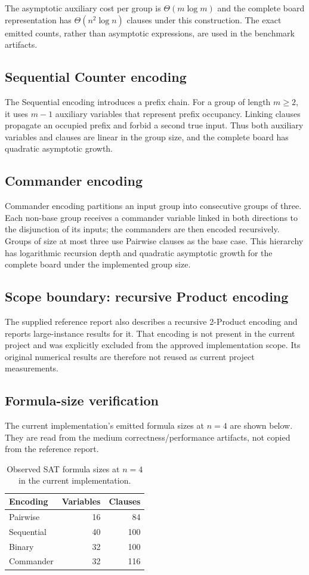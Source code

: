 \documentclass[a4paper,fleqn]{cas-sc}
\begin{document}
The asymptotic auxiliary cost per group is $\Theta(m\log m)$ and the complete
board representation has $\Theta(n^2\log n)$ clauses under this construction.
The exact emitted counts, rather than asymptotic expressions, are used in the
benchmark artifacts.

\subsection{Sequential Counter encoding}
The Sequential encoding introduces a prefix chain. For a group of length
$m\ge2$, it uses $m-1$ auxiliary variables that represent prefix occupancy.
Linking clauses propagate an occupied prefix and forbid a second true input.
Thus both auxiliary variables and clauses are linear in the group size, and
the complete board has quadratic asymptotic growth.

\subsection{Commander encoding}
Commander encoding partitions an input group into consecutive groups of three.
Each non-base group receives a commander variable linked in both directions to
the disjunction of its inputs; the commanders are then encoded recursively.
Groups of size at most three use Pairwise clauses as the base case. This
hierarchy has logarithmic recursion depth and quadratic asymptotic growth for
the complete board under the implemented group size.

\subsection{Scope boundary: recursive Product encoding}
The supplied reference report also describes a recursive 2-Product encoding
and reports large-instance results for it. That encoding is not present in the
current project and was explicitly excluded from the approved implementation
scope. Its original numerical results are therefore not reused as current
project measurements.

\subsection{Formula-size verification}
The current implementation's emitted formula sizes at $n=4$ are shown below.
They are read from the medium correctness/performance artifacts, not copied
from the reference report.

\begin{table}[ht]
\centering
\caption{Observed SAT formula sizes at $n=4$ in the current implementation.}
\label{tab:formula-size}
\begin{tabular}{lrr}
\toprule
Encoding & Variables & Clauses\\
\midrule
Pairwise & 16 & 84\\
Sequential & 40 & 100\\
Binary & 32 & 100\\
Commander & 32 & 116\\
\bottomrule
\end{tabular}
\end{table}
\end{document}

